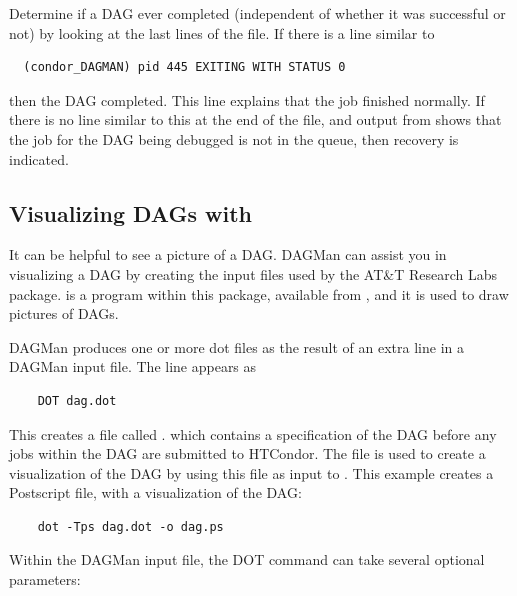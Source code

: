 Determine if a DAG ever completed 
(independent of whether it was successful or not) 
by looking at the last lines of the  file.
If there is a line similar to
\begin{verbatim}
  (condor_DAGMAN) pid 445 EXITING WITH STATUS 0
\end{verbatim}
then the DAG completed.
This line explains that the  job finished normally.
If there is no line similar to this at the end of the  file,
and output from  shows that the  job for
the DAG being debugged is not in the queue,
then recovery is indicated.

\subsection{Visualizing DAGs with }

It can be helpful to see a picture of a DAG.
DAGMan can assist you in visualizing a DAG by creating
the input files used by the AT\&T Research Labs 
 package. 
 is a program within this package,
available from ,
and it is used to draw pictures of DAGs. 

DAGMan produces one or more dot files as the result of
an extra line
in a DAGMan input file. 
The line appears as
\begin{verbatim}
    DOT dag.dot
\end{verbatim}

This creates a file called .
which contains
a specification of the DAG before any jobs within the DAG
are submitted to HTCondor.
The  file is used to create a visualization
of the DAG by using this file as input to .
This example creates a Postscript file, with a visualization of the DAG:

\begin{verbatim}
    dot -Tps dag.dot -o dag.ps
\end{verbatim}

Within the DAGMan input file,
the DOT command can take several optional parameters:

